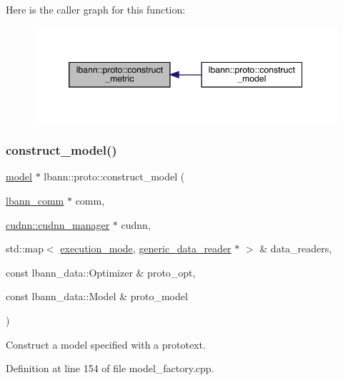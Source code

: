 Here is the caller graph for this function\+:\nopagebreak
\begin{figure}[H]
\begin{center}
\leavevmode
\includegraphics[width=346pt]{namespacelbann_1_1proto_a5b2f4094ce02245e778cfd2fa254d7b4_icgraph}
\end{center}
\end{figure}
\mbox{\label{namespacelbann_1_1proto_a6c051439c9c5cbbfb1a2387d5a3fc902}} 
\subsubsection{\texorpdfstring{construct\+\_\+model()}{construct\_model()}}
{\footnotesize\ttfamily \hyperlink{classlbann_1_1model}{model} $\ast$ lbann\+::proto\+::construct\+\_\+model (\begin{DoxyParamCaption}\item[{\hyperlink{classlbann_1_1lbann__comm}{lbann\+\_\+comm} $\ast$}]{comm,  }\item[{\hyperlink{classlbann_1_1cudnn_1_1cudnn__manager}{cudnn\+::cudnn\+\_\+manager} $\ast$}]{cudnn,  }\item[{std\+::map$<$ \hyperlink{base_8hpp_a2781a159088df64ed7d47cc91c4dc0a8}{execution\+\_\+mode}, \hyperlink{classlbann_1_1generic__data__reader}{generic\+\_\+data\+\_\+reader} $\ast$ $>$ \&}]{data\+\_\+readers,  }\item[{const lbann\+\_\+data\+::\+Optimizer \&}]{proto\+\_\+opt,  }\item[{const lbann\+\_\+data\+::\+Model \&}]{proto\+\_\+model }\end{DoxyParamCaption})}

Construct a model specified with a prototext. 

Definition at line 154 of file model\+\_\+factory.\+cpp.


